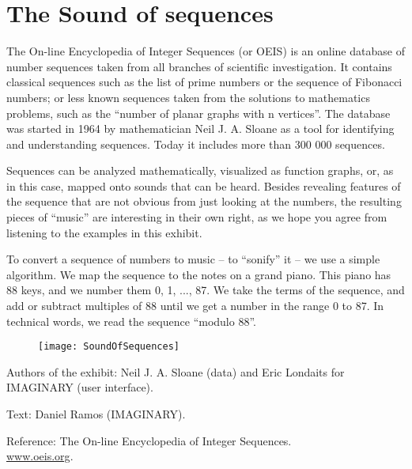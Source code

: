 \section{The Sound of sequences}
The On-line Encyclopedia of Integer Sequences (or OEIS) is an online database of number sequences taken from all branches of scientific investigation. It contains classical sequences such as the list of prime numbers or the sequence of Fibonacci numbers; or less known sequences taken from the solutions to mathematics problems, such as the ``number of planar graphs with n vertices''. The database was started in 1964 by mathematician Neil J. A. Sloane as a tool for identifying and understanding sequences. Today it includes more than 300 000 sequences.

Sequences can be analyzed mathematically, visualized as function graphs, or, as in this case, mapped onto sounds that can be heard. Besides revealing features of the sequence that are not obvious from just looking at the numbers, the resulting pieces of ``music'' are interesting in their own right, as we hope you agree from listening to the examples in this exhibit.

To convert a sequence of numbers to music -- to ``sonify'' it -- we use a simple algorithm. We map the sequence to the notes on a grand piano. This piano has 88 keys, and we number them 0, 1, ..., 87. We take the terms of the sequence, and add or subtract multiples of 88 until we get a number in the range 0 to 87.  In technical words, we read the sequence ``modulo 88''.

\begin{figure}[h]
\centering
\texttt{[image: SoundOfSequences]}
\end{figure}

\begin{sectcredits}
\item[Authors of the exhibit:] Neil J. A. Sloane (data) and Eric Londaits for IMAGINARY (user interface).
\item[Text:] Daniel Ramos (IMAGINARY).
\item[Reference:]
The On-line Encyclopedia of Integer Sequences.\\ \url{www.oeis.org}.
\end{sectcredits}
